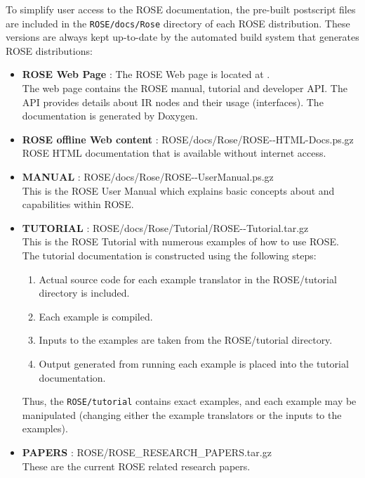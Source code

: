 To simplify user access to the ROSE documentation, the pre-built postscript files are 
included in the {\tt ROSE/docs/Rose} directory of each ROSE distribution. These versions
are always kept up-to-date by the automated build system that generates
ROSE distributions:
\begin{itemize}
   \item {\bf ROSE Web Page} : The ROSE Web page is located at
           . \\
           The web page contains the ROSE manual, tutorial and developer API. 
           The API provides details about IR nodes and their usage (interfaces). The documentation
           is generated by Doxygen.
   \item {\bf ROSE offline Web content} : ROSE/docs/Rose/ROSE-\VersionNumber-HTML-Docs.ps.gz \\
       ROSE HTML documentation that is available without internet access.
   \item {\bf MANUAL} : ROSE/docs/Rose/ROSE-\VersionNumber-UserManual.ps.gz \\
       This is the ROSE User Manual which explains basic concepts about and capabilities within ROSE. \\
   \item {\bf TUTORIAL} : ROSE/docs/Rose/Tutorial/ROSE-\VersionNumber-Tutorial.tar.gz \\
       This is the ROSE Tutorial with numerous examples of how to use ROSE. \\
       The tutorial documentation is
           constructed using the following steps:
           \begin{enumerate}
              \item Actual source code for each example translator in the ROSE/tutorial
                    directory is included. 
              \item Each example is compiled.
              \item Inputs to the examples are taken from the ROSE/tutorial directory.
              \item Output generated from running each example is placed into the tutorial
                    documentation.
           \end{enumerate}
           Thus, the {\tt ROSE/tutorial} contains exact examples, and each
           example may be manipulated (changing either the example translators or the
           inputs to the examples).
   \item {\bf PAPERS} : ROSE/ROSE\_RESEARCH\_PAPERS.tar.gz \\
       These are the current ROSE related research papers.
\end{itemize}

